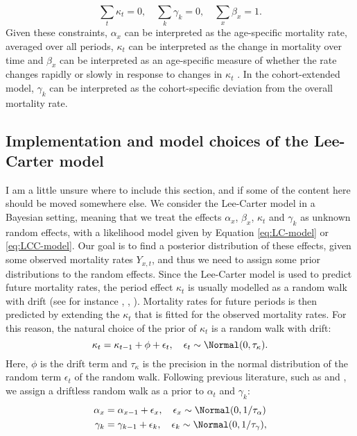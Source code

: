 \begin{equation}
    \sum_t\kappa_t = 0,\quad \sum_k\gamma_k = 0, \quad \sum_x\beta_x = 1.
    \label{eq:LC-constraints}    
\end{equation}
Given these constraints, $\alpha_x$ can be interpreted as the age-specific mortality rate, averaged over all periods, $\kappa_t$ can be interpreted as the change in mortality over time and $\beta_x$ can be interpreted as an age-specific measure of whether the rate changes rapidly or slowly in response to changes in $\kappa_t$ \cite{LeeCarter1992}. In the cohort-extended model, $\gamma_k$ can be interpreted as the cohort-specific deviation from the overall mortality rate.

\subsection{Implementation and model choices of the Lee-Carter model}
\textcolor{myDarkGreen}{I am a little unsure where to include this section, and if some of the content here should be moved somewhere else. }
We consider the Lee-Carter model in a Bayesian setting, meaning that we treat the effects $\alpha_x$, $\beta_x$, $\kappa_t$ and $\gamma_k$ as unknown random effects, with a likelihood model given by Equation \ref{eq:LC-model} or \ref{eq:LCC-model}. Our goal is to find a posterior distribution of these effects, given some observed mortality rates $Y_{x,t}$, and thus we need to assign some prior distributions to the random effects. Since the Lee-Carter model is used to predict future mortality rates, the period effect $\kappa_t$ is usually modelled as a random walk with drift (see for instance \cite{LeeCarter1992}, \cite{Wisniowski2015}, \cite{CZADO2005260}). Mortality rates for future periods is then predicted by extending the $\kappa_t$ that is fitted for the observed mortality rates. For this reason, the natural choice of the prior of $\kappa_t$ is a random walk with drift:
\begin{equation}
    \kappa_t = \kappa_{t-1} + \phi  + \epsilon_t,\quad \epsilon_t \sim \Normal(0,\tau_{\kappa}).
    \label{eq:randomWalkDrift}
\end{equation}
Here, $\phi$ is the drift term and $\tau_{\kappa}$ is the precision in the normal distribution of the random term $\epsilon_t$ of the random walk. 
Following previous literature, such as \citet{CZADO2005260} and \citet{Wisniowski2015}, we assign a driftless random walk as a prior to $\alpha_t$ and $\gamma_k$:
\begin{equation}
    \begin{aligned}
        \alpha_x &= \alpha_{x-1} + \epsilon_{x}, \quad \epsilon_x \sim \Normal(0,1/\tau_{\alpha}) \\
        \gamma_k &= \gamma_{k-1} + \epsilon_{k}, \quad \epsilon_k \sim \Normal(0,1/\tau_{\gamma}), \\
    \end{aligned}
\end{equation}
